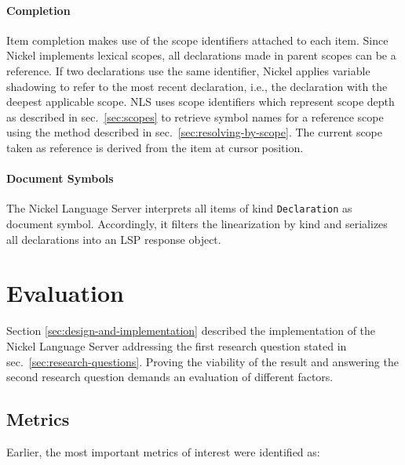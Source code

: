\documentclass[
  a4paper,
  bibtex,
  english,
  nomenclature]{kthlatex/kththesis/kththesis}
\begin{document}
\hypertarget{sec:completion}{%
\subsubsection{Completion}\label{sec:completion}}

Item completion makes use of the scope identifiers attached to each
item. Since Nickel implements lexical scopes, all declarations made in
parent scopes can be a reference. If two declarations use the same
identifier, Nickel applies variable shadowing to refer to the most
recent declaration, i.e., the declaration with the deepest applicable
scope. NLS uses scope identifiers which represent scope depth as
described in sec.~\ref{sec:scopes} to retrieve symbol names for a
reference scope using the method described in
sec.~\ref{sec:resolving-by-scope}. The current scope taken as reference
is derived from the item at cursor position.

\hypertarget{sec:document-symbols}{%
\subsubsection{Document Symbols}\label{sec:document-symbols}}

The Nickel Language Server interprets all items of kind
\texttt{Declaration} as document symbol. Accordingly, it filters the
linearization by kind and serializes all declarations into an LSP
response object.

\hypertarget{sec:evaluation}{%
\chapter{Evaluation}\label{sec:evaluation}}

Section \ref{sec:design-and-implementation} described the implementation
of the Nickel Language Server addressing the first research question
stated in sec.~\ref{sec:research-questions}. Proving the viability of
the result and answering the second research question demands an
evaluation of different factors.

\hypertarget{sec:metrics}{%
\section{Metrics}\label{sec:metrics}}

Earlier, the most important metrics of interest were identified as:
\end{document}
